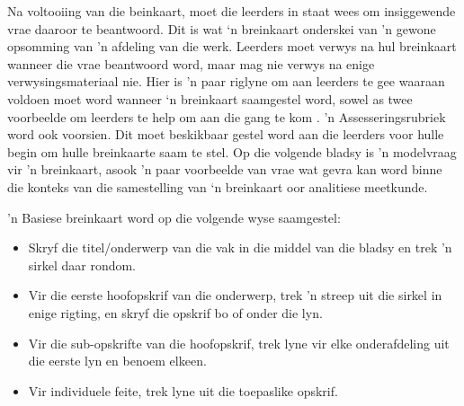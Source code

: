 Na voltooiing van die beinkaart, moet die leerders in staat wees om insiggewende vrae daaroor te beantwoord. Dit is wat ‘n breinkaart onderskei van 'n gewone opsomming van 'n afdeling van die werk. Leerders moet verwys na hul breinkaart wanneer die vrae beantwoord word, maar mag nie verwys na enige verwysingsmateriaal nie. Hier is 'n paar riglyne om aan leerders te gee waaraan voldoen moet word wanneer ‘n breinkaart saamgestel word, sowel as twee voorbeelde om leerders te help om aan die gang te kom . 'n Assesseringsrubriek word ook voorsien. Dit moet beskikbaar gestel word aan die leerders voor hulle begin om hulle breinkaarte saam te stel. Op die volgende bladsy is 'n modelvraag vir 'n breinkaart, asook 'n paar voorbeelde van vrae wat gevra kan word binne die konteks van die samestelling van ‘n breinkaart oor analitiese meetkunde.\par

'n Basiese breinkaart word op die volgende wyse saamgestel:
\begin{itemize}[noitemsep]
\item
Skryf die titel/onderwerp van die vak in die middel van die bladsy en trek 'n sirkel daar rondom.
\item
  Vir die eerste hoofopskrif van die onderwerp, trek 'n streep uit die sirkel in enige rigting, en skryf die opskrif bo of onder die lyn.
\item
 Vir die sub-opskrifte van die hoofopskrif, trek lyne vir elke onderafdeling uit die eerste lyn en benoem elkeen.
\item
 Vir individuele feite, trek lyne uit die toepaslike opskrif.
\end{itemize}


